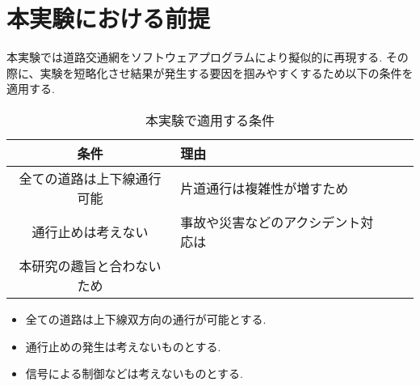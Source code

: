 \section{本実験における前提}

本実験では道路交通網をソフトウェアプログラムにより擬似的に再現する. その際に、実験を短略化させ結果が発生する要因を掴みやすくするため以下の条件を適用する.


\begin{table}[h]
  \caption{本実験で適用する条件}
  \label{table:SpeedOfLight}
  \centering
  \begin{tabular}{clll}
    \hline
      条件 & 理由 \\
      \hline \hline
      全ての道路は上下線通行可能 & 片道通行は複雑性が増すため  \\
      通行止めは考えない & 事故や災害などのアクシデント対応は \\ 本研究の趣旨と合わないため \\
    \hline
  \end{tabular}
\end{table}



\begin{itemize}
  \item 全ての道路は上下線双方向の通行が可能とする.
  \item 通行止めの発生は考えないものとする.
  \item 信号による制御などは考えないものとする.
\end{itemize}

